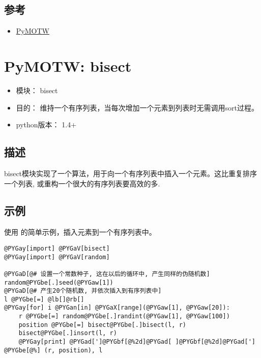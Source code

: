 \documentclass[a4paper,10pt,english]{manual}
\begin{document}
\subsection{参考}
\begin{itemize}
\item {} 
\href{http://http://tc-nsop-test2.tc.baidu.com:3129/documents}{PyMOTW}

\end{itemize}

\resetcurrentobjects

\clearpage
\section{PyMOTW: bisect}
\begin{itemize}
\item {} 
模块： bisect

\item {} 
目的： 维持一个有序列表，当每次增加一个元素到列表时无需调用sort过程。

\item {} 
python版本： 1.4+

\end{itemize}


\subsection{描述}

bisect模块实现了一个算法，用于向一个有序列表中插入一个元素。这比重复排序一个列表, 或重构一个很大的有序列表要高效的多.


\subsection{示例}

使用  的简单示例，插入元素到一个有序列表中。

\begin{Verbatim}[commandchars=@\[\]]
@PYGay[import] @PYGaV[bisect]
@PYGay[import] @PYGaV[random]

@PYGaD[@# 设置一个常数种子, 这在以后的循环中, 产生同样的伪随机数]
random@PYGbe[.]seed(@PYGaw[1])
@PYGaD[@# 产生20个随机数, 并依次插入到有序列表中]
l @PYGbe[=] @lb[]@rb[]
@PYGay[for] i @PYGan[in] @PYGaX[range](@PYGaw[1], @PYGaw[20]):
    r @PYGbe[=] random@PYGbe[.]randint(@PYGaw[1], @PYGaw[100])
    position @PYGbe[=] bisect@PYGbe[.]bisect(l, r)
    bisect@PYGbe[.]insort(l, r)
    @PYGay[print] @PYGad[']@PYGbf[@%2d]@PYGad[ ]@PYGbf[@%2d]@PYGad['] @PYGbe[@%] (r, position), l
\end{Verbatim}
\end{document}
